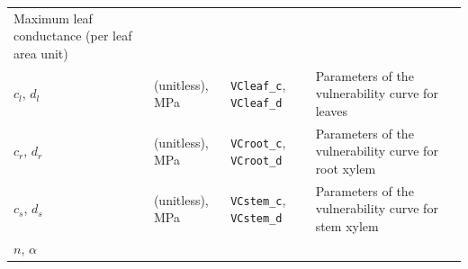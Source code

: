 \documentclass[]{book}
\begin{document}
\begin{longtable}[]{@{}llll@{}}
\begin{minipage}[t]{0.45\columnwidth}
Maximum leaf conductance (per leaf area unit)\strut
\end{minipage}\tabularnewline
\begin{minipage}[t]{0.11\columnwidth}\raggedright\strut
\(c_l\), \(d_l\)\strut
\end{minipage} & \begin{minipage}[t]{0.10\columnwidth}\raggedright\strut
(unitless), MPa\strut
\end{minipage} & \begin{minipage}[t]{0.12\columnwidth}\raggedright\strut
\texttt{VCleaf\_c}, \texttt{VCleaf\_d}\strut
\end{minipage} & \begin{minipage}[t]{0.45\columnwidth}\raggedright\strut
Parameters of the vulnerability curve for leaves\strut
\end{minipage}\tabularnewline
\begin{minipage}[t]{0.11\columnwidth}\raggedright\strut
\(c_r\), \(d_r\)\strut
\end{minipage} & \begin{minipage}[t]{0.10\columnwidth}\raggedright\strut
(unitless), MPa\strut
\end{minipage} & \begin{minipage}[t]{0.12\columnwidth}\raggedright\strut
\texttt{VCroot\_c}, \texttt{VCroot\_d}\strut
\end{minipage} & \begin{minipage}[t]{0.45\columnwidth}\raggedright\strut
Parameters of the vulnerability curve for root xylem\strut
\end{minipage}\tabularnewline
\begin{minipage}[t]{0.11\columnwidth}\raggedright\strut
\(c_s\), \(d_s\)\strut
\end{minipage} & \begin{minipage}[t]{0.10\columnwidth}\raggedright\strut
(unitless), MPa\strut
\end{minipage} & \begin{minipage}[t]{0.12\columnwidth}\raggedright\strut
\texttt{VCstem\_c}, \texttt{VCstem\_d}\strut
\end{minipage} & \begin{minipage}[t]{0.45\columnwidth}\raggedright\strut
Parameters of the vulnerability curve for stem xylem\strut
\end{minipage}\tabularnewline
\begin{minipage}[t]{0.11\columnwidth}\raggedright\strut
\(n\), \(\alpha\)\strut
\end{minipage} & \begin{minipage}[t]{0.10\columnwidth}\raggedright\strut

\end{minipage}
\end{longtable}
\end{document}
